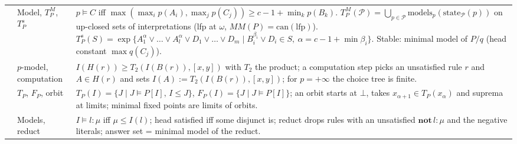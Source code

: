 {\begin{longtable}{@{}p{}p{}p{}@{}}
            \cite{Lukasiewicz01}                                                                     & Model, $T^M_P$, $T^s_P$                                  & $p\models C$ iff $\max(\max_ip(A_i),\max_jp(C_j))\geq c-1+\min_kp(B_k)$. $T^M_P(\mathcal P)=\bigcup_{p\in\mathcal P}\mathrm{models}_p(\mathrm{state}_{\mathcal P}(p))$ on up-closed sets of interpretations (lfp at $\omega$, $\mathit{MM}(P)=\mathrm{can}(\mathrm{lfp})$). $T^s_P(S)=\exp\{A^\alpha_1\lor\dots\lor A^\alpha_l\lor D_1\lor\dots\lor D_m\mid B_i^{\beta_i}\lor D_i\in S,\ \alpha=c-1+\min\beta_i\}$. Stable: minimal model of $P/q$ (head constant $\max q(C_j)$). \\
            \cite{Mateis00}                                                                          & $p$-model, computation                                   & $I(H(r))\geq T_2(I(B(r)),[x,y])$ with $T_2$ the product; a computation step picks an unsatisfied rule $r$ and $A\in H(r)$ and sets $I(A):=T_2(I(B(r)),[x,y])$; for $p=+\infty$ the choice tree is finite.                                                                                                                                                                                                                                                                         \\
            \cite{StracciaOD09}                                                                      & $T_P$, $F_P$, orbit                                      & $T_P(I)=\{J\mid J\models P[I],\,I\leq J\}$, $F_P(I)=\{J\mid J\models P[I]\}$; an orbit starts at $\bot$, takes $x_{\alpha+1}\in T_P(x_\alpha)$ and suprema at limits; minimal fixed points are limits of orbits.                                                                                                                                                                                                                                                                  \\
            \cite{Saad2010disjunctive}                                                               & Models, reduct                                           & $I\models l:\mu$ iff $\mu\leq I(l)$; head satisfied iff some disjunct is; reduct drops rules with an unsatisfied $\mathbf{not}\,l:\mu$ and the negative literals; answer set = minimal model of the reduct.                                                                                                                                                                                                                                                                       \\

\end{longtable}}
